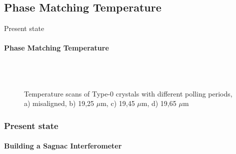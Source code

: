 \documentclass[serif,8pt]{beamer}
\begin{document}
{{\subsection{Phase Matching Temperature}
\begin{frame}{Present state}
	\framesubtitle{Phase Matching Temperature}
	\begin{figure}[!ht]
	  \centering
	  \caption{Temperature scans of Type-0 crystals with different polling periods, a) misaligned, b) 19,25 $\mu$m, c) 19,45 $\mu$m, d) 19,65 $\mu$m}
	  \quad
	  \pause
	  \\
	  \quad
	  \\
	  \label{fig:sub2}
	\end{figure}
\end{frame}

{
\begin{frame}[t]
	\frametitle{Present state}
	\framesubtitle{Building a Sagnac Interferometer}


\end{frame}}}}
\end{document}
